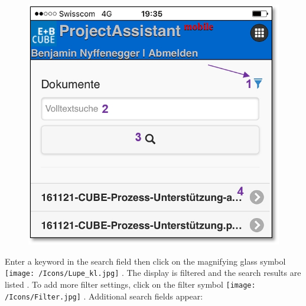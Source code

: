 \begin{figure}   %
  \vspace{-35pt}      %
  \begin{center}
    \includegraphics[width=1\linewidth]{../chapters/11_Dokumentenablage/pictures/11-mob04_Dokumentenuebersicht.jpg}
  \end{center}
  \vspace{-20pt}
  \vspace{-10pt}
\end{figure}

Enter a keyword in the search field  then click on the magnifying glass symbol \texttt{[image: /Icons/Lupe\_kl.jpg]} . The display is filtered and the search results are listed . To add more filter settings, click on the filter symbol \texttt{[image: /Icons/Filter.jpg]} . Additional search fields appear:

\vspace{3.5cm}

